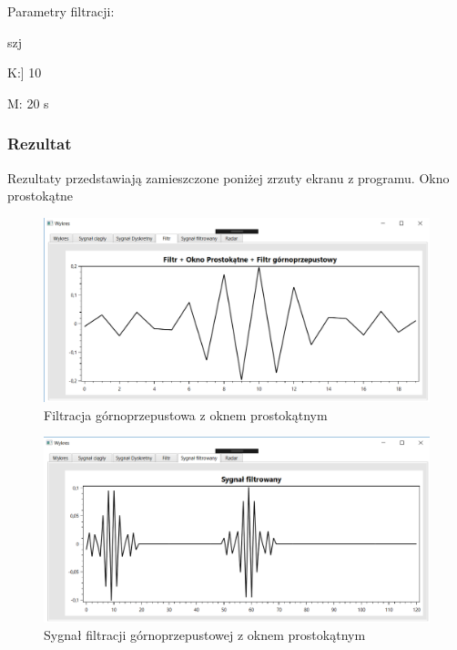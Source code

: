 \documentclass[12pt]{article}
\begin{document}
Parametry filtracji:

\begin{labeling}{szj}
\item K:] 10
\item [M:] 20 s
\end{labeling}

\subsubsection{Rezultat}

Rezultaty przedstawiają zamieszczone poniżej zrzuty ekranu z programu. 
Okno prostokątne
\begin{figure}[h!]
 \centering
 \includegraphics[width=12.3cm]{prostFGOP.PNG}
 \vspace{-0.3cm}
 \caption{Filtracja górnoprzepustowa z oknem prostokątnym}
 \label{gfh}
\end{figure}
 
\begin{figure}[h!]
 \centering
 \includegraphics[width=12.3cm]{prostSFGP.PNG}
 \vspace{-0.3cm}
 \caption{Sygnał filtracji górnoprzepustowej z oknem prostokątnym}
 \label{hg}
\end{figure}
\end{document}
